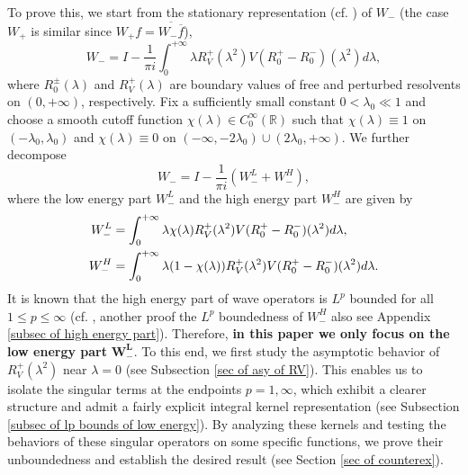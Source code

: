 \documentclass[reqno]{amsart}
\newcommand\R{\mathbb{R}}
\numberwithin{equation}{section}
\begin{document}
To prove this, 
we start from the stationary representation (cf. \cite{Kur73,RS75,RS78}) of $W_{-}$ (the case $W_{+}$ is similar since $W_{+}f=\overline{W_{-}\overline{f}}$), 
$$W_{-}=I-\frac{1}{\pi i}\int_{0}^{+\infty} \lambda R^+_{V}({\lambda}^{2})V(R^+_{0}-R^-_{0})({\lambda}^{2})d\lambda,$$
where $R^{\pm}_{0}(\lambda)$ and $R^{+}_{V}(\lambda)$ are boundary values of free and perturbed resolvents on $(0,+\infty)$, respectively. Fix a sufficiently small constant $0<\lambda_0\ll1$ and choose a smooth cutoff function  $\chi(\lambda)\in C^{\infty}_{0}(\R)$ such that $\chi(\lambda)\equiv1 $ on $(-\lambda_{0},\lambda_{0})$ and  $\chi(\lambda)\equiv0 $ on $(-\infty,-2\lambda_{0})\cup(2\lambda_{0},+\infty)$. We further decompose 
\begin{equation*}
W_{-}=I-\frac{1}{\pi i}(W^L_{-}+W^H_{-}),
\end{equation*}
where the low energy part $W^L_{-}$ and the high energy part $W^H_{-}$ are given by 
\begin{align}
W^{L}_{-}&=\int_{0}^{+\infty}\lambda\chi(\lambda)R^{+}_{V}(\lambda^{2})V(R^+_{0}-R^-_{0})({\lambda}^{2})d\lambda,\notag\\ 
W^{H}_{-}&=\int_{0}^{+\infty}\lambda(1-\chi(\lambda))R^{+}_{V}(\lambda^{2})V(R^+_{0}-R^-_{0})({\lambda}^{2})d\lambda.\label{high energy part}
\end{align}
 It is known that the high energy part of wave operators is $L^p$ bounded for all $1\leq p\leq \infty$ (cf. \cite{Wed99}, another proof the $L^p$ boundedness of $W^H_{-}$ also see Appendix \ref{subsec of high energy part}). Therefore, {\bf in this paper we only focus on the low energy part} $\bm {W^L_{-}}$. To this end, we first study the asymptotic behavior of $R^{+}_V(\lambda^2)$ near $\lambda=0$ (see Subsection \ref{sec of asy of RV}). This enables us to isolate the singular terms at the endpoints $p = 1, \infty$, which exhibit a clearer structure and admit a fairly explicit integral kernel representation (see Subsection \ref{subsec of lp bounds of low energy}). By analyzing these kernels and testing the behaviors of these singular operators on some specific functions, we prove their unboundedness and establish the desired result (see Section \ref{sec of counterex}). 
\end{document}
